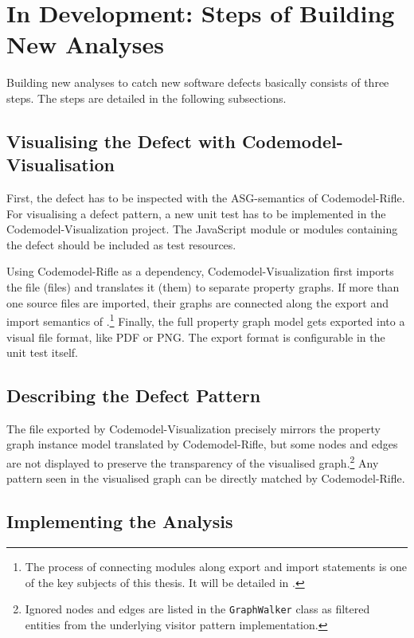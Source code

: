\section{In Development: Steps of Building New Analyses}

Building new analyses to catch new software defects basically consists of three steps. The steps are detailed in the following subsections.


\subsection{Visualising the Defect with Codemodel-Visualisation}

First, the defect has to be inspected with the ASG-semantics of Codemodel-Rifle. For visualising a defect pattern, a new unit test has to be implemented in the Codemodel-Visualization project. The JavaScript module or modules containing the defect should be included as test resources.

Using Codemodel-Rifle as a dependency, Codemodel-Visualization first imports the file (files) and translates it (them) to separate property graphs. If more than one source files are imported, their graphs are connected along the export and import semantics of \es.\footnote{The process of connecting \es modules along export and import statements is one of the key subjects of this thesis. It will be detailed in .} Finally, the full property graph model gets exported into a visual file format, like PDF or PNG. The export format is configurable in the unit test itself.


\subsection{Describing the Defect Pattern}

The file exported by Codemodel-Visualization precisely mirrors the property graph instance model translated by Codemodel-Rifle, but some nodes and edges are not displayed to preserve the transparency of the visualised graph.\footnote{Ignored nodes and edges are listed in the \lstinline{GraphWalker} class as filtered entities from the underlying visitor pattern implementation.} Any pattern seen in the visualised graph can be directly matched by Codemodel-Rifle.


\subsection{Implementing the Analysis}
\label{subsection:implementing-analyses}


